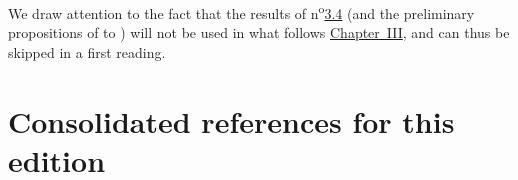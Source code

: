 We draw attention to the fact that the results of n\textsuperscript{o}\hyperref[subsection:III.3.4]{3.4} (and the preliminary propositions of  to ) will not be used in what follows \hyperref[section:ega3]{Chapter~III}, and can thus be skipped in a first reading.
\bigskip







\clearpage
{}
{}
\section*{Consolidated references for this edition}




